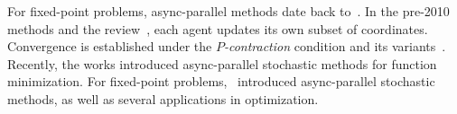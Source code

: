 For fixed-point problems, async-parallel methods date back to~\citep{baudet1978asynchronous}. In  the pre-2010 methods \citep{BMR1997asyn-multisplit,bertsekas1983distributed,Baz200591,el1998flexible} and the review~\citep{frommer2000asynchronous}, each agent updates its own subset of coordinates. Convergence is established under the \emph{$P$-contraction} condition and its variants~\citep{bertsekas1983distributed}. Recently, the works \citep{nedic2001distributed,recht2011hogwild,liu2013asynchronous,liu2014asynchronous,hsieh2015passcode} introduced async-parallel stochastic methods for function minimization.
For fixed-point problems,~\citep{PengXuYanYin2015_arock} introduced  async-parallel stochastic methods, as well as several applications in optimization. 



